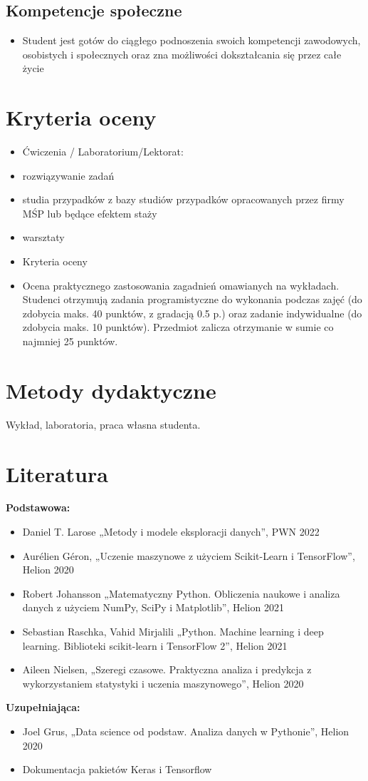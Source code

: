 \documentclass[12pt, a4paper]{article}
\begin{document}
\subsection*{Kompetencje społeczne}
\begin{itemize}
  \item Student jest gotów do ciągłego podnoszenia swoich kompetencji zawodowych, osobistych i społecznych oraz zna możliwości dokształcania się przez całe życie
\end{itemize}

\section{Kryteria oceny}

\begin{itemize}
  \item Ćwiczenia / Laboratorium/Lektorat:
  \item rozwiązywanie zadań
  \item studia przypadków z bazy studiów przypadków opracowanych przez firmy MŚP lub będące efektem staży
  \item warsztaty
  \item Kryteria oceny
  \item Ocena praktycznego zastosowania zagadnień omawianych na wykładach. Studenci otrzymują zadania programistyczne do wykonania podczas zajęć (do zdobycia maks. 40 punktów, z gradacją 0.5 p.) oraz zadanie indywidualne (do zdobycia maks. 10 punktów). Przedmiot zalicza otrzymanie w sumie co najmniej 25 punktów.
\end{itemize}

\section{Metody dydaktyczne}

Wykład, laboratoria, praca własna studenta.

\section{Literatura}

\textbf{Podstawowa:}
\begin{itemize}
  \item Daniel T. Larose „Metody i modele eksploracji danych”, PWN 2022
  \item Aurélien Géron, „Uczenie maszynowe z użyciem Scikit-Learn i TensorFlow”, Helion 2020
  \item Robert Johansson „Matematyczny Python. Obliczenia naukowe i analiza danych z użyciem NumPy, SciPy i Matplotlib”, Helion 2021
  \item Sebastian Raschka, Vahid Mirjalili „Python. Machine learning i deep learning. Biblioteki scikit-learn i TensorFlow 2”, Helion 2021
  \item Aileen Nielsen, „Szeregi czasowe. Praktyczna analiza i predykcja z wykorzystaniem statystyki i uczenia maszynowego”, Helion 2020
\end{itemize}

\textbf{Uzupełniająca:}
\begin{itemize}
  \item Joel Grus, „Data science od podstaw. Analiza danych w Pythonie”, Helion 2020
  \item Dokumentacja pakietów Keras i Tensorflow
\end{itemize}
\end{document}
